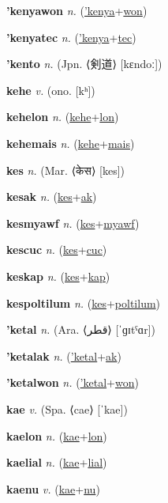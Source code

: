 \textbf{\hypertarget{'kenyawon}{'kenyawon}} \textit{n.} (\hyperlink{'kenya}{'kenya}+\allowbreak \hyperlink{won}{won})


\textbf{\hypertarget{'kenyatec}{'kenyatec}} \textit{n.} (\hyperlink{'kenya}{'kenya}+\allowbreak \hyperlink{tec}{tec})


\textbf{\hypertarget{'kento}{'kento}} \textit{n.} (Jpn. ⟨{\japanese{}剣道}⟩ [kɛndoː])


\textbf{\hypertarget{kehe}{kehe}} \textit{v.} (ono. [kʰ])


\textbf{\hypertarget{kehelon}{kehelon}} \textit{n.} (\hyperlink{kehe}{kehe}+\allowbreak \hyperlink{lon}{lon})


\textbf{\hypertarget{kehemais}{kehemais}} \textit{n.} (\hyperlink{kehe}{kehe}+\allowbreak \hyperlink{mais}{mais})


\textbf{\hypertarget{kes}{kes}} \textit{n.} (Mar. ⟨{\devanagari{}केस}⟩ [kes])


\textbf{\hypertarget{kesak}{kesak}} \textit{n.} (\hyperlink{kes}{kes}+\allowbreak \hyperlink{ak}{ak})


\textbf{\hypertarget{kesmyawf}{kesmyawf}} \textit{n.} (\hyperlink{kes}{kes}+\allowbreak \hyperlink{myawf}{myawf})


\textbf{\hypertarget{kescuc}{kescuc}} \textit{n.} (\hyperlink{kes}{kes}+\allowbreak \hyperlink{cuc}{cuc})


\textbf{\hypertarget{keskap}{keskap}} \textit{n.} (\hyperlink{kes}{kes}+\allowbreak \hyperlink{kap}{kap})


\textbf{\hypertarget{kespoltilum}{kespoltilum}} \textit{n.} (\hyperlink{kes}{kes}+\allowbreak \hyperlink{poltilum}{poltilum})


\textbf{\hypertarget{'ketal}{'ketal}} \textit{n.} (Ara. ⟨{\arabics{}قطر‎}⟩ [ˈɡɪtˤɑr])


\textbf{\hypertarget{'ketalak}{'ketalak}} \textit{n.} (\hyperlink{'ketal}{'ketal}+\allowbreak \hyperlink{ak}{ak})


\textbf{\hypertarget{'ketalwon}{'ketalwon}} \textit{n.} (\hyperlink{'ketal}{'ketal}+\allowbreak \hyperlink{won}{won})


\textbf{\hypertarget{kae}{kae}} \textit{v.} (Spa. ⟨cae⟩ [ˈkae])


\textbf{\hypertarget{kaelon}{kaelon}} \textit{n.} (\hyperlink{kae}{kae}+\allowbreak \hyperlink{lon}{lon})


\textbf{\hypertarget{kaelial}{kaelial}} \textit{n.} (\hyperlink{kae}{kae}+\allowbreak \hyperlink{lial}{lial})


\textbf{\hypertarget{kaenu}{kaenu}} \textit{v.} (\hyperlink{kae}{kae}+\allowbreak \hyperlink{nu}{nu})


